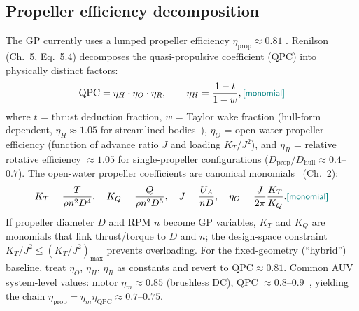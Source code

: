 \documentclass{new-aiaa}
\newcommand{\gpc}[1]{\textcolor{teal}{\small\textsf{[#1]}}} %
\begin{document}
\subsection{Propeller efficiency decomposition}\label{sec:propeller}
The GP currently uses a lumped propeller efficiency $\eta_{\text{prop}}\approx0.81$
\cite{allen2000propulsion}. Renilson~\cite{renilson2018submarine} (Ch.~5, Eq.~5.4) decomposes the
quasi-propulsive coefficient (QPC) into physically distinct factors:
\begin{equation}
\text{QPC} = \eta_H \cdot \eta_O \cdot \eta_R,
\qquad \eta_H = \frac{1-t}{1-w}, \gpc{monomial}
\end{equation}
where $t$ = thrust deduction fraction, $w$ = Taylor wake fraction (hull-form dependent,
$\eta_H\approx1.05$ for streamlined bodies~\cite{renilson2018submarine}), $\eta_O$ = open-water
propeller efficiency (function of advance ratio $J$ and loading $K_T/J^2$), and $\eta_R$ = relative
rotative efficiency $\approx1.05$ for single-propeller configurations
($D_{\text{prop}}/D_{\text{hull}}\approx0.4$--$0.7$). The open-water propeller coefficients are
canonical monomials~\cite{newman2018marine} (Ch.~2):
\begin{equation}
K_T = \frac{T}{\rho n^2 D^4},\quad
K_Q = \frac{Q}{\rho n^2 D^5},\quad
J   = \frac{U_A}{n D},\quad
\eta_O = \frac{J}{2\pi}\frac{K_T}{K_Q}. \gpc{monomial}
\end{equation}
If propeller diameter $D$ and RPM $n$ become GP variables, $K_T$ and $K_Q$ are monomials that link
thrust/torque to $D$ and $n$; the design-space constraint $K_T/J^2 \le (K_T/J^2)_{\max}$ prevents
overloading. For the fixed-geometry (``hybrid'') baseline, treat $\eta_O$, $\eta_H$, $\eta_R$ as
constants and revert to $\text{QPC}\approx0.81$. Common AUV system-level values:
motor $\eta_m\approx0.85$ (brushless DC), QPC $\approx0.8$--$0.9$~\cite{renilson2018submarine},
yielding the chain $\eta_{\text{prop}} = \eta_m\eta_{\text{QPC}} \approx 0.7$--$0.75$.
\end{document}
